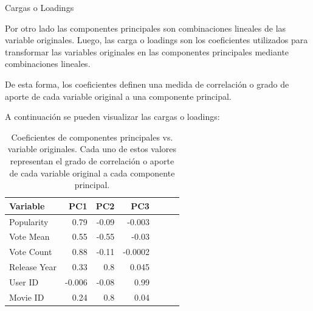 \documentclass[11pt,a4paper,twoside]{thesis}
\begin{document}
\begin{description}
	\item[Cargas o Loadings]
\end{description}

Por otro lado las componentes principales son combinaciones lineales de las variable originales. Luego, las carga o loadings son los coeficientes utilizados para transformar las variables originales en las componentes principales mediante combinaciones lineales.

De esta forma, los coeficientes definen una medida de correlación o grado de aporte de cada variable original a una componente principal.

A continuación se pueden visualizar las cargas o loadings:

\begin{table}[h!]
	\centering
	\begin{tabular}{lrrrrrr}
			\toprule Variable & PC1    &  PC2  & PC3    \\
			\midrule Popularity  &0.79   & -0.09 & -0.003  \\
					Vote Mean & 0.55   & -0.55 & -0.03      \\
					Vote Count & 0.88   & -0.11 & -0.0002\\
					Release Year & 0.33   &  0.8  &  0.045\\
					User ID & -0.006 & -0.08 &  0.99    \\
					Movie ID & 0.24   &  0.8  &  0.04 \\
			\bottomrule
	\end{tabular}

	\caption{Coeficientes de componentes principales vs. variable originales. Cada uno de estos valores representan el grado de correlación o aporte de cada variable original a cada componente principal.}

	\label{fig:loadingsTable}
\end{table}
\end{document}
